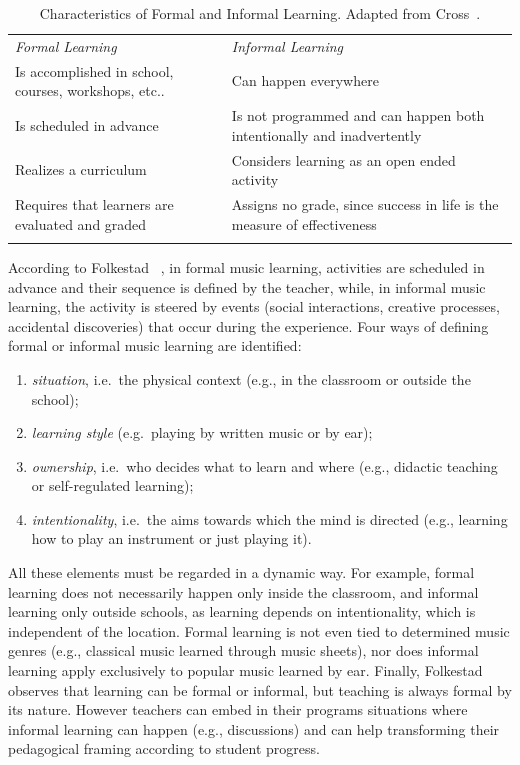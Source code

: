 \documentclass[journal]{IEEEtran}
\begin{document}
\begin{table}[tb]
	\caption{Characteristics of Formal and Informal Learning. Adapted from 
		Cross~\cite{cross2011informal}.}
	\label{tab:FIL}  
	\centering     
	\begin{tabular}{p{}p{}}
		\hline\noalign{\smallskip}
		\textit{Formal Learning} & \textit{Informal Learning}  \\
		\noalign{\smallskip}\noalign{\smallskip}
		Is accomplished in school, courses, workshops, etc.. & Can happen everywhere\\
		Is scheduled in advance & Is not programmed and can happen both intentionally and inadvertently\\
		Realizes a curriculum & Considers learning as an open ended activity\\
		Requires that learners are evaluated and graded & Assigns no grade, since success in life is the measure of effectiveness\\
		\noalign{\smallskip}\hline\noalign{\smallskip}
	\end{tabular}
\end{table}

According to Folkestad ~\cite{folkestad2006formal}, in formal music learning, activities are scheduled in advance and their sequence is defined by the teacher, while, in informal music learning, the activity is steered by events (social interactions, creative processes, accidental discoveries) that occur during the experience.
Four ways of defining formal or informal music learning are identified: 

\begin{enumerate}
	\item \textit{situation}, i.e.\ the physical context (e.g., in the classroom or outside the school);
	\item \textit{learning style} (e.g.\ playing by written music or by ear);
	\item \textit{ownership}, i.e.\ who decides what to learn and where (e.g., didactic teaching or self-regulated learning);
	\item \textit{intentionality}, i.e.\ the aims towards which the mind is directed (e.g., learning how to play an instrument or just playing it).
\end{enumerate}

All these elements must be regarded in a dynamic way. For example, formal learning does not necessarily happen only inside the classroom, and informal learning only outside schools, as learning depends on intentionality, which is independent of the location. Formal learning is not even tied to determined music genres (e.g., classical music learned through music sheets), nor does informal learning apply exclusively to popular music learned by ear. Finally, Folkestad~\cite{folkestad2006formal} observes that learning can be formal or informal, but teaching is always formal by its nature. However teachers can embed in their programs situations where informal learning can happen (e.g., discussions) and can help transforming their pedagogical framing according to student progress.
\end{document}
